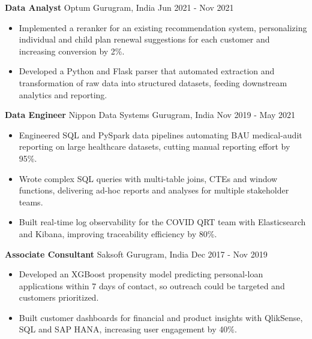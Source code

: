 \documentclass[10pt,a4paper]{article}
\newcommand{\role}[4]{\textbf{#1} \textbar{} #2 \hfill #3 \textbar{} #4\par}
\begin{document}
\vspace{3pt}
\role{Data Analyst}{Optum}{Gurugram, India}{Jun 2021 - Nov 2021}
\begin{itemize}
  \item Implemented a reranker for an existing recommendation system, personalizing individual and child plan renewal suggestions for each customer and increasing conversion by 2\%.
  \item Developed a Python and Flask parser that automated extraction and transformation of raw data into structured datasets, feeding downstream analytics and reporting.
\end{itemize}
\vspace{3pt}
\role{Data Engineer}{Nippon Data Systems}{Gurugram, India}{Nov 2019 - May 2021}
\begin{itemize}
  \item Engineered SQL and PySpark data pipelines automating BAU medical-audit reporting on large healthcare datasets, cutting manual reporting effort by 95\%.
  \item Wrote complex SQL queries with multi-table joins, CTEs and window functions, delivering ad-hoc reports and analyses for multiple stakeholder teams.
  \item Built real-time log observability for the COVID QRT team with Elasticsearch and Kibana, improving traceability efficiency by 80\%.
\end{itemize}
\vspace{3pt}
\role{Associate Consultant}{Saksoft}{Gurugram, India}{Dec 2017 - Nov 2019}
\begin{itemize}
  \item Developed an XGBoost propensity model predicting personal-loan applications within 7 days of contact, so outreach could be targeted and customers prioritized.
  \item Built customer dashboards for financial and product insights with QlikSense, SQL and SAP HANA, increasing user engagement by 40\%.
\end{itemize}
\end{document}
